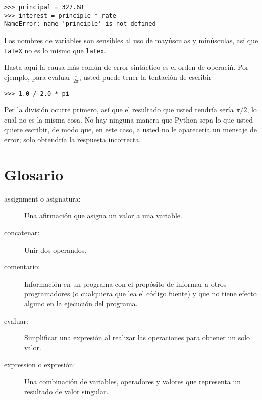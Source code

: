 \begin{ex}
\beforeverb
\begin{verbatim}
>>> principal = 327.68
>>> interest = principle * rate
NameError: name 'principle' is not defined
\end{verbatim}
\afterverb
%
Los nombres de variables son sensibles al uso de may\'usculas y min\'usculas, as\'i que {\tt LaTeX} no es lo mismo que {\tt latex}.


Hasta aqu\'i la causa m\'as com\'un de error sint\'actico es el orden de operaci\'n. Por ejemplo, para evaluar $\frac{1}{2 \pi}$,
usted puede tener la tentaci\'on de escribir

\beforeverb
\begin{verbatim}
>>> 1.0 / 2.0 * pi
\end{verbatim}
\afterverb
%
Per la divisi\'on ocurre primero, as\'i que el resultado que usted tendr\'ia ser\'ia $\pi / 2$, lo cual no es la misma cosa. No hay ninguna manera que Python
sepa lo que usted quiere escribir, de modo que, en este caso, a usted no le aparecer\'ia un mensaje de error; solo obtendr\'ia la respuesta incorrecta.




\section{Glosario}

\begin{description}

\item[assignment o asignatura:]  Una afirmaci\'on que asigna un valor a una variable.




\item[concatenar:]  Unir dos operandos.


\item[comentario:]  Informaci\'on en un programa con el prop\'osito de informar a otros programadores (o cualquiera que lea el c\'odigo fuente) y que no tiene efecto alguno en la ejecuci\'on del programa.

\item[evaluar:]  Simplificar una expresi\'on al realizar las operaciones para obtener un solo valor.

\item[expression o expresi\'on:]  Una combinaci\'on de variables, operadores y valores que
representa un resultado de valor singular.


\end{description}
\end{ex}

